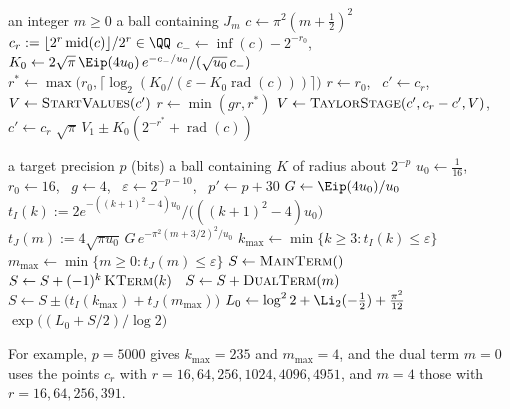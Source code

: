 \begin{algorithm}[ht]
\caption{$\textsc{DualTerm}(m)$}\label{alg:dual}
\begin{algorithmic}[1]
\small
\Require an integer $m \ge 0$
\Ensure a ball containing $J_m$
\State $c \gets \pi^2(m+\frac12)^2$ 
\State $c_r := \lfloor 2^r\operatorname{mid}(c)\rfloor/2^r \in \QQ$
\State $c_- \gets \inf(c) - 2^{-r_0}$, \
  $K_0 \gets 2\sqrt\pi\,\Eip(4u_0)\,e^{-c_-/u_0}/(\sqrt{u_0}\,c_-)$
\State $r^* \gets \max\bigl(r_0, \lceil\log_2(K_0/(\varepsilon - K_0\operatorname{rad}(c)))\rceil\bigr)$
\State $r \gets r_0$, \ $c' \gets c_r$, \ $V \gets \textsc{StartValues}(c')$
\While{$r < r^*$}
  \State $r \gets \min(gr, r^*)$
  \State $V \gets \textsc{TaylorStage}(c', c_r - c', V)$, \ $c' \gets c_r$
\EndWhile
\State \Return $\sqrt\pi\,V_1 \pm K_0(2^{-r^*} + \operatorname{rad}(c))$ 
\end{algorithmic}
\end{algorithm}

\begin{algorithm}[ht]
\caption{$\textsc{Khinchin}(p)$}\label{alg:khinchin}
\begin{algorithmic}[1]
\small
\Require a target precision $p$ (bits)
\Ensure a ball containing $K$ of radius about $2^{-p}$
\State $u_0 \gets \frac1{16}$, \ $r_0 \gets 16$, \ $g \gets 4$, \ $\varepsilon \gets 2^{-p-10}$, \ $p' \gets p + 30$
\State $G \gets \Eip(4u_0)/u_0$
\State $t_I(k) := 2e^{-((k+1)^2-4)u_0}/\bigl(((k+1)^2-4)u_0\bigr)$
\State $t_J(m) := 4\sqrt{\pi u_0}\,G\,e^{-\pi^2(m+3/2)^2/u_0}$
\State $k_{\max} \gets \min\{k \ge 3 : t_I(k) \le \varepsilon\}$
\State $m_{\max} \gets \min\{m \ge 0 : t_J(m) \le \varepsilon\}$
\State $S \gets \textsc{MainTerm}()$
 \ $S \gets S + (-1)^k\,\textsc{KTerm}(k)$ \EndFor
\For{$m = 0, \dots, m_{\max}$} \ $S \gets S + \textsc{DualTerm}(m)$ \EndFor
\State $S \gets S \pm \bigl(t_I(k_{\max}) + t_J(m_{\max})\bigr)$
\State $L_0 \gets \log^22 + \Li_2(-\frac12) + \frac{\pi^2}{12}$
\State \Return $\exp\bigl((L_0 + S/2)/\log 2\bigr)$
\end{algorithmic}
\end{algorithm}

For example, $p = 5000$ gives $k_{\max} = 235$ and $m_{\max} = 4$, and the dual term $m = 0$ uses the points
$c_r$ with $r = 16, 64, 256, 1024, 4096, 4951$, and $m = 4$ those with $r = 16, 64, 256, 391$.
